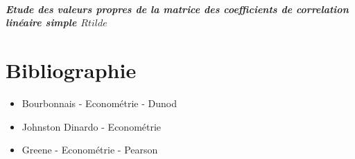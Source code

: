 \documentclass{article}
\begin{document}
\subsubsection{Etude des valeurs propres de la matrice des coefficients de correlation
linéaire simple $Rtilde$}
\part{Bibliographie}
\begin{itemize}
    \item Bourbonnais - Econométrie - Dunod
    \item Johnston Dinardo - Econométrie
    \item Greene - Econométrie - Pearson 
\end{itemize}
\end{document}
